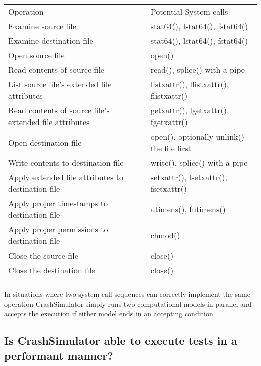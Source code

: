 \begin{table*}[t]
    \scriptsize{}
    \begin{tabular}{l | l }
    \toprule{}
      Operation                                               & Potential System calls\\
      Examine source file                                     & stat64(), lstat64(), fstat64()\\
      Examine destination file                                & stat64(), lstat64(), fstat64()\\
      Open source file                                        & open()\\
      Read contents of source file                            & read(), splice() with a pipe\\
      List source file's extended file attributes             & listxattr(), llistxattr(), flistxattr()\\
      Read contents of source file's extended file attributes & getxattr(), lgetxattr(), fgetxattr()\\
      Open destination file                                   & open(), optionally unlink() the file first\\
      Write contents to destination file                      & write(), splice() with a pipe\\
      Apply extended file attributes to destination file      & setxattr(), lsetxattr(), fsetxattr()\\
      Apply proper timestamps to destination file             & utimens(), futimens()\\
      Apply proper permissions to destination file            & chmod()\\
      Close the source file                                   & close()\\
      Close the destination file                              & close()\\

              
    \bottomrule{}
    \end{tabular}
\end{table*}
    
In situations where two system call sequences can correctly implement the same operation CrashSimulator simply runs
two computational models in parallel and accepts the execution if either model ends in an accepting condition. 



\subsection{Is CrashSimulator able to execute tests in a performant manner?}

